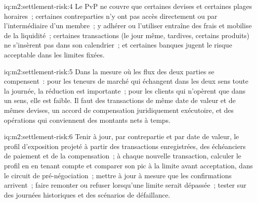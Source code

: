 \begin{solution}{iq:m2:settlement-risk:4}
Le PvP ne couvre que certaines devises et certaines plages horaires~; certaines contreparties n'y ont pas accès
directement ou par l'intermédiaire d'un membre~; y adhérer ou l'utiliser entraîne des frais et mobilise de la
liquidité~; certaines transactions (le jour même, tardives, certains produits) ne s'insèrent pas dans son
calendrier~; et certaines banques jugent le risque acceptable dans les limites fixées.
\end{solution}

\begin{solution}{iq:m2:settlement-risk:5}
Dans la mesure où les flux des deux parties se compensent~: pour les teneurs de marché qui échangent
dans les deux sens toute la journée, la réduction est importante~; pour les clients qui n'opèrent que dans un
sens, elle est faible. Il faut des transactions de même date de valeur et de mêmes devises, un accord de
compensation juridiquement exécutoire, et des opérations qui conviennent des montants nets à temps.
\end{solution}

\begin{solution}{iq:m2:settlement-risk:6}
Tenir à jour, par contrepartie et par date de valeur, le profil d'exposition projeté à partir des
transactions enregistrées, des échéanciers de paiement et de la compensation~; à chaque nouvelle transaction,
calculer le profil en en tenant compte et comparer son pic à la limite avant acceptation, dans le
circuit de pré-négociation~; mettre à jour à mesure que les confirmations arrivent~; faire remonter ou
refuser lorsqu'une limite serait dépassée~; tester sur des journées historiques et des scénarios de défaillance.
\end{solution}
